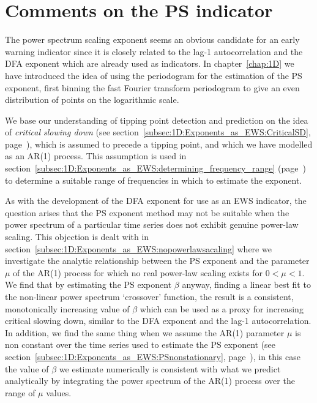 	
	
\section{Comments on the PS indicator}
\label{sec:conc:PScomments}

The power spectrum scaling exponent seems an obvious candidate for an early warning indicator since it is closely related to the lag-1 autocorrelation and the DFA exponent which are already used as indicators. In chapter~\ref{chap:1D} we have introduced the idea of using the periodogram for the estimation of the PS exponent, first binning the fast Fourier transform periodogram to give an even distribution of points on the logarithmic scale. 

We base our understanding of tipping point detection and prediction on the idea of \emph{critical slowing down} (see section~\ref{subsec:1D:Exponents_as_EWS:CriticalSD}, page~\pageref{subsec:1D:Exponents_as_EWS:CriticalSD}), which is assumed to precede a tipping point, and which we have modelled as an AR(1) process. This assumption is used in section~\ref{subsec:1D:Exponents_as_EWS:determining_frequency_range} (page~\pageref{subsec:1D:Exponents_as_EWS:determining_frequency_range}) to determine a suitable range of frequencies in which to estimate the exponent. 

As with the development of the DFA exponent for use as an EWS indicator, the question arises that the PS exponent method may not be suitable when the power spectrum of a particular time series does not exhibit genuine power-law scaling. This objection is dealt with in section~\ref{subsec:1D:Exponents_as_EWS:nopowerlawsacaling} where we investigate the analytic relationship between the PS exponent and the parameter $\mu$ of the AR(1) process for which no real power-law scaling exists for $0<\mu<1$. We find that by estimating the PS exponent $\beta$ anyway, finding a linear best fit to the non-linear power spectrum `crossover' function, the result is a consistent, monotonically increasing value of $\beta$ which can be used as a proxy for increasing critical slowing down, similar to the DFA exponent and the lag-1 autocorrelation. In addition, we find the same thing when we assume the AR(1) parameter $\mu$ is non constant over the time series used to estimate the PS exponent (see section~\ref{subsec:1D:Exponents_as_EWS:PSnonstationary}, page~\pageref{subsec:1D:Exponents_as_EWS:PSnonstationary}), in this case the value of $\beta$ we estimate numerically is consistent with what we predict analytically by integrating the power spectrum of the AR(1) process over the range of $\mu$ values. 

